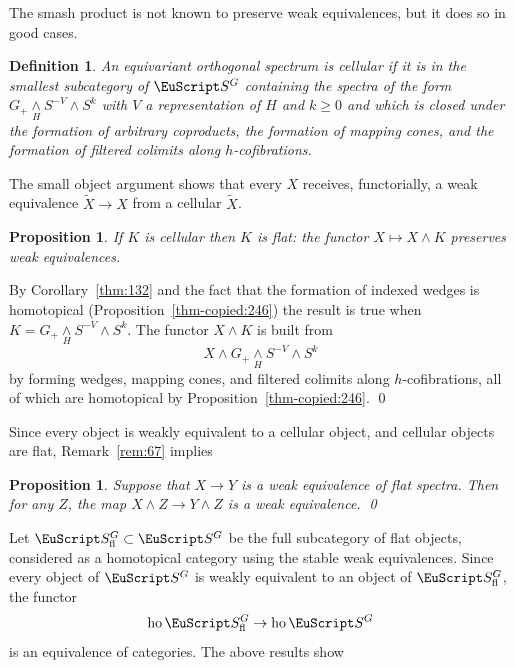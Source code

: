\documentclass{amsart}
\newtheorem{prop}[equation]{Proposition}
\newtheorem{definition}[equation]{Definition}
\newenvironment{defin}{\begin{definition}\rm}{\end{definition}}
\theoremstyle{definition}
\newtheorem{defin}[equation]{Definition}
\theoremstyle{remark}
\newenvironment{pf}{\bigskip{\em Proof:\/}}{\qed\medskip}
\newcommand{\spectra}{\EuScript S}
\DeclareMathOperator{\ho}{ho}
\newcommand{\ugspectra}[1]{\spectra^{#1}}
\newcommand{\flugspectra}[1]{\spectra^{#1}_{\text{fl}}}
\begin{document}
The smash product is not known to preserve weak equivalences, but it
does so in good cases.

\begin{defin}
\label{def-copied:58} An equivariant orthogonal spectrum is
{\em cellular} if it is in the smallest subcategory of $\ugspectra{G}$
containing the spectra of the form $G_{+}\underset{H}{\wedge}
S^{-V}\wedge S^{k}$ with $V$ a representation of $H$ and $k\ge 0$ and
which is closed under the formation of arbitrary coproducts, the
formation of mapping cones, and the formation of filtered colimits
along $h$-cofibrations.
\end{defin}

The small object argument shows that every $X$ receives, functorially,
a weak equivalence $\tilde X\to X$ from a cellular $\tilde X$.

\begin{prop}
\label{thm-copied:250} If $K$ is cellular then $K$ is {\em flat}: the
functor $X\mapsto X\wedge K$ preserves weak equivalences.
\end{prop}


\begin{pf}
By Corollary~\ref{thm:132} and the fact that the formation of indexed
wedges is homotopical (Proposition~\ref{thm-copied:246}) the result is true when
$K=G_{+}\underset{H}{\wedge} S^{-V}\wedge S^{k}$.  The functor
$X\wedge K$ is built from
\[
X\wedge G_{+}\underset{H}{\wedge} S^{-V}\wedge S^{k}
\]
by forming wedges, mapping cones, and filtered colimits along
$h$-cofibrations, all of which are homotopical by
Proposition~\ref{thm-copied:246}.
\end{pf}

Since every object is weakly equivalent to a cellular object, and
cellular objects are flat, Remark~\ref{rem:67} implies

\begin{prop}
\label{thm:263}
Suppose that $X\to Y$ is a weak equivalence of flat spectra.   Then
for any $Z$, the map $X\wedge Z\to Y\wedge Z$ is a weak equivalence. \qed
\end{prop}

Let $\flugspectra{G}\subset\ugspectra{G}$ be the full subcategory of
flat objects, considered as a homotopical category using the stable
weak equivalences.  Since every object of $\ugspectra{G}$ is weakly
equivalent to an object of $\flugspectra{G}$, the functor
\begin{equation}
\label{eq:170}
\ho\flugspectra{G}\to \ho\ugspectra{G}
\end{equation}
is an equivalence of categories.   The above results show
\end{document}
